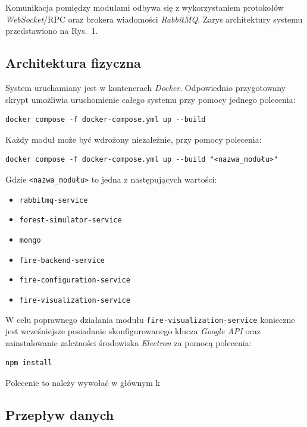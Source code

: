 Komunikacja pomiędzy modułami odbywa się z wykorzystaniem protokołów 
\textit{WebSocket}/RPC oraz brokera wiadomości \textit{RabbitMQ}. 
Zarys architektury systemu przedstawiono na Rys.~1.

\subsection{Architektura fizyczna}

System uruchamiany jest w kontenerach \textit{Docker}. 
Odpowiednio przygotowany skrypt umożliwia uruchomienie całego systemu 
przy pomocy jednego polecenia:

\begin{verbatim}
docker compose -f docker-compose.yml up --build
\end{verbatim}

Każdy moduł może być wdrożony niezależnie, przy pomocy polecenia:

\begin{verbatim}
docker compose -f docker-compose.yml up --build "<nazwa_modułu>"
\end{verbatim}

Gdzie \texttt{<nazwa\_modułu>} to jedna z następujących wartości:

\begin{itemize}
    \item \texttt{rabbitmq-service}
    \item \texttt{forest-simulator-service}
    \item \texttt{mongo}
    \item \texttt{fire-backend-service}
    \item \texttt{fire-configuration-service}
    \item \texttt{fire-visualization-service}
\end{itemize}

W celu poprawnego działania modułu 
\texttt{fire-visualization-service} konieczne jest wcześniejsze
posiadanie skonfigurowanego klucza \textit{Google API} oraz zainstalowanie
zależności środowiska \textit{Electron} za pomocą polecenia:

\begin{verbatim}
npm install
\end{verbatim}

Polecenie to należy wywołać w głównym k


\subsection{Przepływ danych}
